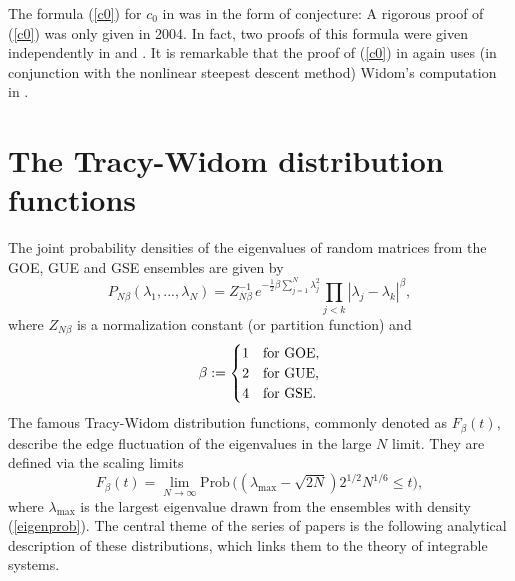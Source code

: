 \documentclass[11pt,letterpaper,reqno]{amsart}
\theoremstyle{definition}
\theoremstyle{remark}
\numberwithin{equation}{section}
\begin{document}
The formula (\ref{c0}) for  $c_0$ in \cite{D2} was in the form of conjecture: A
rigorous proof of (\ref{c0}) was only given in 2004. In fact, two proofs of  this formula
were given independently in \cite{K} and \cite{E}.
It is remarkable that the proof of (\ref{c0}) in \cite{K} again uses (in conjunction with the nonlinear steepest descent method)
Widom's computation in  \cite{33}.





\section{The Tracy-Widom distribution functions}
The  joint probability densities of  the eigenvalues of  random matrices
from the GOE, GUE and GSE ensembles %
are given by
\begin{equation}\label{eigenprob}
P_{N\beta}(\lambda_1, ..., \lambda_N) =
Z^{-1}_{N\beta}\,e^{-\frac{1}{2}\beta\sum_{j=1}^{N}\lambda^{2}_j}
\prod_{j<k}|\lambda_j - \lambda_k|^{\beta},
\end{equation}
where $Z_{N\beta}$ is a normalization constant (or  partition function) and
$$
\beta := \begin{cases}
1 & \textrm{for GOE},\cr
2 & \textrm{for GUE},\cr
4 & \textrm{for GSE}.
\end{cases}
$$
The famous Tracy-Widom distribution functions, commonly denoted
as $F_{\beta}(t)$,  describe the edge fluctuation
of the eigenvalues in the large $N$ limit. They are defined via the
scaling limits
\begin{equation}\label{Airy1}
F_{\beta}(t) = \lim_{N\to \infty}\textrm{Prob}\,\bigl((\lambda_{\max} -\sqrt{2N})2^{1/2}N^{1/6}
\leq t\bigl),
\end{equation}
where $\lambda_{\max}$ is the largest eigenvalue drawn from the ensembles with density (\ref{eigenprob}).
The central theme of the series of papers \cite{74,75,80,84,96} is the following analytical description of
these distributions, which links them to the theory of integrable systems.
\end{document}
